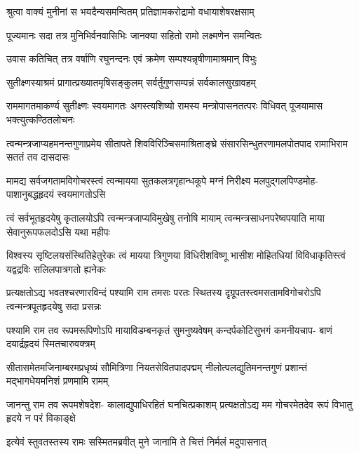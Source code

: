 \twolineshloka
{श्रुत्वा वाक्यं मुनीनां स भयदैन्यसमन्वितम्}
{प्रतिज्ञामकरोद्रामो वधायाशेषरक्षसाम्} %

\twolineshloka
{पूज्यमानः सदा तत्र मुनिभिर्वनवासिभिः}
{जानक्या सहितो रामो लक्ष्मणेन समन्वितः} %

\twolineshloka
{उवास कतिचित् तत्र वर्षाणि रघुनन्दनः}
{एवं क्रमेण सम्पश्यन्नृषीणामाश्रमान् विभुः} %

\twolineshloka
{सुतीक्ष्णस्याश्रमं प्रागात्प्रख्यातमृषिसङ्कुलम्}
{सर्वर्तुगुणसम्पन्नं सर्वकालसुखावहम्} %

\threelineshloka
{राममागतमाकर्ण्य सुतीक्ष्णः स्वयमागतः}
{अगस्त्यशिष्यो रामस्य मन्त्रोपासनतत्परः}
{विधिवत् पूजयामास भक्त्युत्कण्ठितलोचनः} %


\fourlineindentedshloka
{त्वन्मन्त्रजाप्यहमनन्तगुणाप्रमेय}
{सीतापते शिवविरिञ्चिसमाश्रिताङ्घ्रे}
{संसारसिन्धुतरणामलपोतपाद}
{रामाभिराम सततं तव दासदासः} %

\fourlineindentedshloka
{मामद्य सर्वजगतामविगोचरस्त्वं}
{त्वन्मायया सुतकलत्रगृहान्धकूपे}
{मग्नं निरीक्ष्य मलपुद्गलपिण्डमोह-}
{पाशानुबद्धहृदयं स्वयमागतोऽसि} %

\fourlineindentedshloka
{त्वं सर्वभूतहृदयेषु कृतालयोऽपि}
{त्वन्मन्त्रजाप्यविमुखेषु तनोषि मायाम्}
{त्वन्मन्त्रसाधनपरेष्वपयाति माया}
{सेवानुरूपफलदोऽसि यथा महीपः} %

\fourlineindentedshloka
{विश्वस्य सृष्टिलयसंस्थितिहेतुरेकः}
{त्वं मायया त्रिगुणया विधिरीशविष्णू}
{भासीश मोहितधियां विविधाकृतिस्त्वं}
{यद्वद्रविः सलिलपात्रगतो ह्यनेकः} %

\fourlineindentedshloka
{प्रत्यक्षतोऽद्य भवतश्चरणारविन्दं}
{पश्यामि राम तमसः परतः स्थितस्य}
{दृग्रूपतस्त्वमसतामविगोचरोऽपि}
{त्वन्मन्त्रपूतहृदयेषु सदा प्रसन्नः} %

\fourlineindentedshloka
{पश्यामि राम तव रूपमरूपिणोऽपि}
{मायाविडम्बनकृतं सुमनुष्यवेषम्}
{कन्दर्पकोटिसुभगं कमनीयचाप-}
{बाणं दयार्द्रहृदयं स्मितचारुवक्त्रम्} %

\fourlineindentedshloka
{सीतासमेतमजिनाम्बरमप्रधृष्यं}
{सौमित्रिणा नियतसेवितपादपद्मम्}
{नीलोत्पलद्युतिमनन्तगुणं प्रशान्तं}
{मद्भागधेयमनिशं प्रणमामि रामम्} %

\fourlineindentedshloka
{जानन्तु राम तव रूपमशेषदेश-}
{कालाद्युपाधिरहितं घनचित्प्रकाशम्}
{प्रत्यक्षतोऽद्य मम गोचरमेतदेव}
{रूपं विभातु हृदये न परं विकाङ्क्षे} %

\twolineshloka
{इत्येवं स्तुवतस्तस्य रामः सस्मितमब्रवीत्}
{मुने जानामि ते चित्तं निर्मलं मदुपासनात्} %


